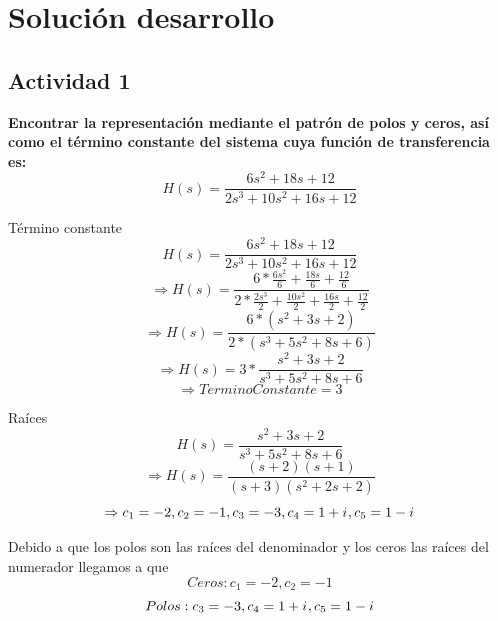 \justify
\section{Solución desarrollo}
\subsection{Actividad 1}

\noindent\textbf{Encontrar la representación mediante el patrón de polos y ceros, así como el término constante del sistema cuya función de transferencia es:}
	\begin{equation}
		H(s)=\frac{6s^2+18s+12}{2s^3+10s^2+16s+12}
	\end{equation}
	\newline
	
	Término constante
	\begin{equation}
		H(s)=\frac{6s^2+18s+12}{2s^3+10s^2+16s+12}
	\end{equation}
	\begin{equation}
		\Rightarrow H(s)=\frac{6*\frac{6s^2}{6}+\frac{18s}{6}+\frac{12}{6}}{2*\frac{2s^3}{2}+\frac{10s^2}{2}+\frac{16s}{2}+\frac{12}{2}}
	\end{equation}
	\begin{equation}
		\Rightarrow H(s)=\frac{6*(s^2+3s+2)}{2*(s^3+5s^2+8s+6)}
	\end{equation}
	\begin{equation}
		\Rightarrow H(s)=3*\frac{s^2+3s+2}{s^3+5s^2+8s+6}
	\end{equation}	
	\begin{equation}
		\Rightarrow Termino Constante = 3
	\end{equation}
	
	Raíces
	\begin{equation}
		H(s)=\frac{s^2+3s+2}{s^3+5s^2+8s+6}
	\end{equation}	
	\begin{equation}
		\Rightarrow H(s)=\frac{(s+2)(s+1)}{(s+3)(s^2+2s+2)}
	\end{equation}		
	\begin{equation}
		\Rightarrow c_1=-2,c_2=-1,c_3=-3,c_4=1+{i\mkern1mu},c_5=1-{i\mkern1mu}
	\end{equation}		
	
	\noindent Debido a que los polos son las raíces del denominador y los ceros las raíces del numerador llegamos a que
	\begin{equation}
		Ceros: c_1=-2,c_2=-1 
	\end{equation}		
	\begin{equation}
		Polos: c_3=-3,c_4=1+{i\mkern1mu},c_5=1-{i\mkern1mu}
	\end{equation}

